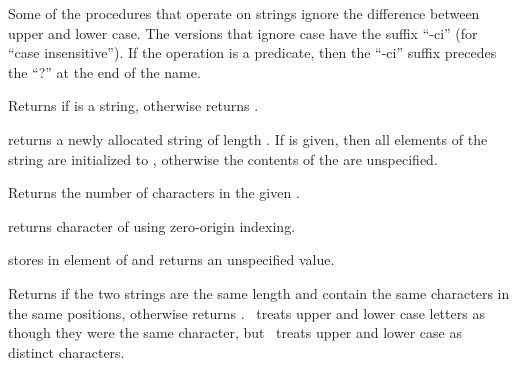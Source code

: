 \vest Some of the procedures that operate on strings ignore the
difference between upper and lower case.  The versions that ignore case
have the suffix \hbox{``{\cf -ci}''} (for ``case insensitive'').  If the
operation is a predicate, then the \hbox{``{\cf -ci}''} suffix precedes the
\hbox{``{\cf ?}''} at the end of the name.


\begin{entry}{%
}

Returns \schtrue{} if  is a string, otherwise returns \schfalse.
\end{entry}


\begin{entry}{%
}

   returns a newly allocated string of
length .  If  is given, then all elements of the string
are initialized to , otherwise the contents of the
 are unspecified.

\end{entry}

\begin{entry}{%
}

Returns the number of characters in the given .
\end{entry}


\begin{entry}{%
}

 returns character  of  using zero-origin indexing.
\end{entry}


\begin{entry}{%
}

 stores  in element  of 
and returns an unspecified value.  %

\end{entry}


\begin{entry}{%
}

Returns \schtrue{} if the two strings are the same length and contain the same
characters in the same positions, otherwise returns \schfalse.
\ treats
upper and lower case letters as though they were the same character, but
\ treats upper and lower case as distinct characters.

\end{entry}


